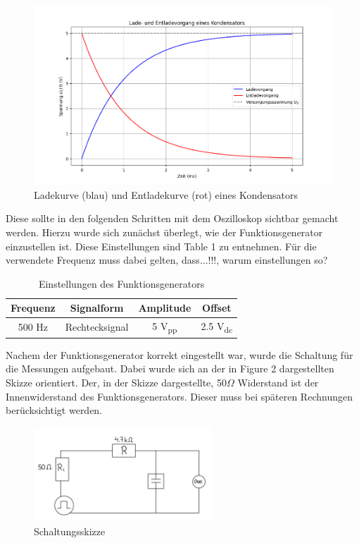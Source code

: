 \documentclass[a4paper,12pt]{article}
\begin{document}
\begin{figure}[H]
    \centering
    \includegraphics[width=1.0\textwidth]{../Quellen/Labor2/Lade-EntladefunktionSkizze.png}
\caption{Ladekurve (blau) und Entladekurve (rot) eines Kondensators}
\end{figure}

\noindent Diese sollte in den folgenden Schritten mit dem Oszilloskop sichtbar gemacht werden. Hierzu wurde sich zunächst überlegt, wie der Funktionsgenerator einzustellen ist. Diese Einstellungen sind Table 1 zu entnehmen. Für die verwendete Frequenz muss dabei gelten, dass...!!!, warum einstellungen so?

\begin{table}[H]
	\centering
	\begin{tabular}{|c|c|c|c|}
		\hline
		\textbf{Frequenz} & \textbf{Signalform} & \textbf{Amplitude} & \textbf{Offset}\\
		\hline
		500 Hz & Rechtecksignal & 5 V\textsubscript{pp} & 2.5 V\textsubscript{dc}\\
		\hline
	\end{tabular}
	\caption{Einstellungen des Funktionsgenerators}
\end{table}

\noindent Nachem der Funktionsgenerator korrekt eingestellt war, wurde die Schaltung  für die Messungen aufgebaut. Dabei wurde sich an der in Figure 2 dargestellten Skizze orientiert. Der, in der Skizze dargestellte, 50$\Omega$ Widerstand ist der Innenwiderstand des Funktionsgenerators. Dieser muss bei späteren Rechnungen berücksichtigt werden.\\

\begin{figure}[H]
    \centering
    \includegraphics[width=0.6\textwidth]{../Quellen/Labor2/SchaltungsaufbauVersuch1.jpeg}
\caption{Schaltungsskizze}
\end{figure}
\end{document}

